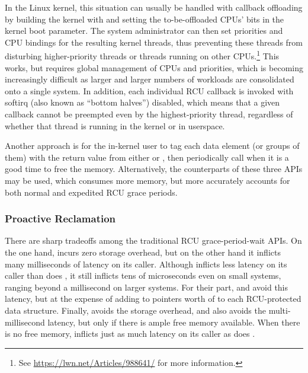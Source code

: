 In the Linux kernel, this situation can usually be handled with callback
offloading by building the kernel with  and
setting the to-be-offloaded CPUs' bits in the  kernel
boot parameter.
The system administrator can then set priorities and CPU bindings for
the resulting  kernel threads, thus preventing these threads from
disturbing higher-priority threads or threads running on other CPUs.\footnote{
	See \url{https://lwn.net/Articles/988641/} for more information.}
This works, but requires global management of CPUs and priorities,
which is becoming increasingly difficult as larger and larger numbers
of workloads are consolidated onto a single system.
In addition, each individual RCU callback is invoked with softirq (also
known as ``bottom halves'') disabled, which means that a given callback
cannot be preempted even by the highest-priority thread, regardless of
whether that thread is running in the kernel or in userspace.

Another approach is for the in-kernel user to tag each data element
(or groups of them) with the return value from either
 or ,
then periodically call  when it is
a good time to free the memory.
Alternatively, the  counterparts of these three APIs may be
used, which consumes more memory, but more accurately accounts for both
normal and expedited RCU grace periods.

\subsubsection{Proactive Reclamation}
\label{sec:together:Proactive Reclamation}

There are sharp tradeoffs among the traditional RCU grace-period-wait
APIs.
On the one hand,  incurs zero storage overhead,
but on the other hand it inflicts many milliseconds of latency on
its caller.
Although  inflicts less latency
on its caller than does , it still inflicts
tens of microseconds even on small systems, ranging beyond a
millisecond on larger systems.
For their part,  and  avoid this
latency, but at the expense of adding to pointers worth of 
to each RCU-protected data structure.
Finally,  avoids the  storage
overhead, and also avoids the multi-millisecond latency, but only if
there is ample free memory available.
When there is no free memory,  inflicts just
as much latency on its caller as does .

